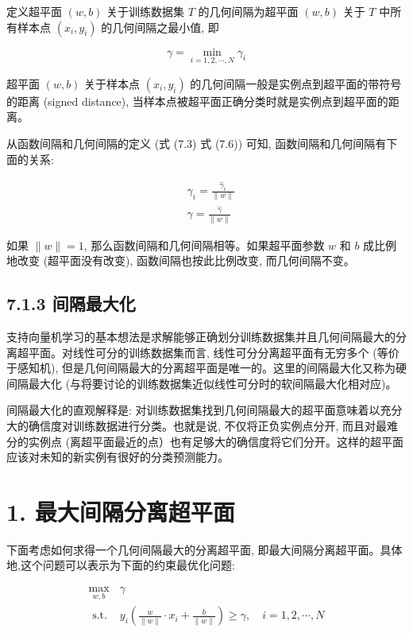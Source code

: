 \documentclass[10pt]{article}
\begin{document}
\begin{CJK*}{UTF8}{bsmi}
定义超平面 $(w, b)$ 关于训练数据集 $T$ 的几何间隔为超平面 $(w, b)$ 关于 $T$ 中所有样本点 $\left(x_{i}, y_{i}\right)$ 的几何间隔之最小值, 即


\begin{equation*}
\gamma=\min _{i=1,2, \cdots, N} \gamma_{i} \tag{7.6}
\end{equation*}


超平面 $(w, b)$ 关于样本点 $\left(x_{i}, y_{i}\right)$ 的几何间隔一般是实例点到超平面的带符号的距离 (signed distance), 当样本点被超平面正确分类时就是实例点到超平面的距离。

从函数间隔和几何间隔的定义 (式 (7.3) 式 (7.6)) 可知, 函数间隔和几何间隔有下面的关系:


\begin{align*}
& \gamma_{i}=\frac{\hat{\gamma}_{i}}{\|w\|}  \tag{7.7}\\
& \gamma=\frac{\hat{\gamma}}{\|w\|} \tag{7.8}
\end{align*}


如果 $\|w\|=1$, 那么函数间隔和几何间隔相等。如果超平面参数 $w$ 和 $b$ 成比例地改变 (超平面没有改变), 函数间隔也按此比例改变, 而几何间隔不变。

\subsection*{7.1.3 间隔最大化}
支持向量机学习的基本想法是求解能够正确划分训练数据集并且几何间隔最大的分离超平面。对线性可分的训练数据集而言, 线性可分分离超平面有无穷多个 (等价于感知机), 但是几何间隔最大的分离超平面是唯一的。这里的间隔最大化又称为硬间隔最大化 (与将要讨论的训练数据集近似线性可分时的软间隔最大化相对应)。

间隔最大化的直观解释是: 对训练数据集找到几何间隔最大的超平面意味着以充分大的确信度对训练数据进行分类。也就是说, 不仅将正负实例点分开, 而且对最难分的实例点 (离超平面最近的点）也有足够大的确信度将它们分开。这样的超平面应该对未知的新实例有很好的分类预测能力。

\section*{1. 最大间隔分离超平面}
下面考虑如何求得一个几何间隔最大的分离超平面, 即最大间隔分离超平面。具体地,这个问题可以表示为下面的约束最优化问题:

\[
\begin{array}{ll}
\max _{w, b} & \gamma \\
\text { s.t. } & y_{i}\left(\frac{w}{\|w\|} \cdot x_{i}+\frac{b}{\|w\|}\right) \geqslant \gamma, \quad i=1,2, \cdots, N \tag{7.10}
\end{array}
\]


\end{CJK*}
\end{document}
